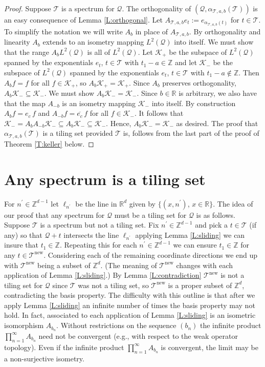 \documentclass[12pt]{amsart}
\theoremstyle{plain}
\numberwithin{equation}{section}
\newcommand{\Q}{\ensuremath{\mathcal{Q}}\xspace}
\newcommand{\T}{\ensuremath{\mathcal{T}}\xspace}
\newcommand{\K}{\ensuremath{\mathcal{K}}\xspace}
\newcommand{\Rd}{\ensuremath{\mathbb{R}^{d}}\xspace}
\newcommand{\R}{\ensuremath{\mathbb{R}}\xspace}
\newcommand{\Z}{\ensuremath{\mathbb{Z}}\xspace}
\newcommand{\Zd}{\ensuremath{\mathbb{Z}^{d}}\xspace}
\begin{document}
\begin{proof}
   Suppose \T  is a spectrum for \Q.
   The orthogonality of $(\Q,\alpha_{\T,a,b}(\T))$
   is an easy consequence of Lemma \ref{L:orthogonal}.
   Let $A_{\T,a,b}e_t:=e_{\alpha_{\T,a,b}(t)}$ for $t\in\T$. To
   simplify the notation we will write $A_b$ in place of
   $A_{\T,a,b}$.
   By orthogonality and linearity $A_b$ extends to
   an isometry mapping $L^2(\Q)$ into itself. We must show that
   the range $A_bL^2(\Q)$ is all of $L^2(\Q)$. Let $\K_+$ be the
   subspace of $L^2(\Q)$ spanned by the exponentials $e_t$, $t\in\T$
   with $t_1-a\in\Z$ and let $\K_-$ be the
   subspace of $L^2(\Q)$ spanned by the exponentials $e_t$, $t\in\T$
   with $t_1-a\notin\Z$. Then $A_bf=f$ for all $f\in\K_+$, so
   $A_b\K_+=\K_+$. Since $A_b$ preserves orthogonality,
   $A_b\K_-\subseteq\K_-$. We must show
   $A_b\K_-=\K_-$. Since $b\in\R$ is arbitrary, we also have that
   the map $A_{-b}$ is an isometry mapping $\K_-$ into itself.
   By construction
   $A_bf=e_c\,f$ and $A_{-b}f=\overline{e_c}\,f$
   for all $f\in\K_-$. It follows that
   $\K_-=A_{b}A_{-b}\K_-\subseteq A_{b}\K_-\subseteq\K_-$. Hence,
   $A_b\K_-=\K_-$ as desired. The proof that $\alpha_{\T,a,b}(\T)$ is
   a tiling set provided \T is, follows from the last part of the
   proof of Theorem \ref{T:keller} below.
\end{proof}

\section{Any spectrum is a tiling set}\label{S:s_to_t}
For $n^{\prime}\in\Z^{d-1}$ let $\ell_{n^{\prime}}$ be the line
in \Rd given by $\{(x,n^{\prime})$, $x\in\R\}$.
The idea of our proof that any spectrum for
\Q must be a tiling set for \Q is as follows. Suppose \T is a
spectrum but not a tiling set. Fix $n^{\prime}\in\Z^{d-1}$ and
pick a $t\in\T$ (if any) so that $\Q+t$ intersects the line
$\ell_{n^{\prime}}$ applying Lemma \ref{L:sliding} we
can insure that $t_1\in\Z$. Repeating this for
each $n^{\prime}\in\Z^{d-1}$ we can ensure $t_1\in\Z$ for any
$t\in\T^{\text{new}}$.
Considering each of
the remaining coordinate directions we end up with $\T^{\text{new}}$
being a subset of $\Zd$. (The meaning of $\T^{\text{new}}$ changes
with each application of Lemma \ref{L:sliding}.)
By Lemma \ref{L:contradiction} $\T^{\text{new}}$ is not a tiling
set for
\Q since \T was not a tiling set, so $\T^{\text{new}}$ is a proper
subset of \Zd, contradicting the basis property. The difficulty with
this outline is that after we apply Lemma
\ref{L:sliding} an infinite number of times the basis property may
not hold. In fact, associated to each application of Lemma
\ref{L:sliding} is an isometric isomorphism $A_{b_n}$. Without
restrictions on the sequence $(b_n)$ the
infinite product $\prod_{n=1}^{\infty}A_{b_n}$
need not be convergent
(e.g., with respect to the weak operator topology). Even if the
infinite product $\prod_{n=1}^{\infty}A_{b_n}$ is convergent, the
limit may be a non-surjective isometry.
\end{document}
